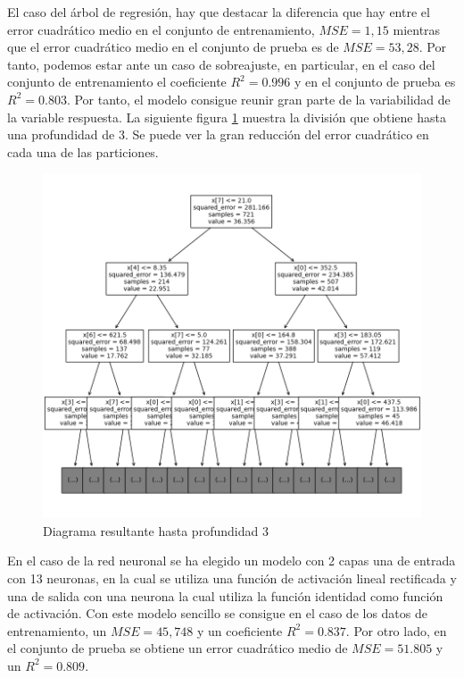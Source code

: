 \noindent El caso del árbol de regresión, hay que destacar la diferencia que hay entre el error cuadrático medio en el conjunto de entrenamiento, $MSE=1,15$ mientras que el error cuadrático medio en el conjunto de prueba es de $MSE=53,28$. Por tanto, podemos estar ante un caso de sobreajuste, en particular, en el caso del conjunto de entrenamiento el coeficiente $R^2=0.996$ y en el conjunto de prueba es $R^2=0.803$.  Por tanto, el modelo consigue reunir gran parte de la variabilidad de la variable respuesta. La siguiente figura \ref{fig:diagrama arbol} muestra la división que obtiene hasta una profundidad de 3. Se puede ver la gran reducción del error cuadrático en cada una de las particiones.

\begin{figure}[h]
  \centering
  \includegraphics[scale=0.30]{Documentos Extra/Imagenes/Arbol.png}
  \caption{Diagrama resultante hasta profundidad 3}
  \label{fig:diagrama arbol}
\end{figure}
  

\noindent En el caso de la red neuronal se ha elegido un modelo con 2 capas una de entrada con 13 neuronas, en la cual se utiliza una función de activación lineal rectificada y una de salida con una neurona la cual utiliza la función identidad como función de activación. Con este modelo sencillo se consigue en el caso de los datos de entrenamiento, un $MSE=45,748$ y un coeficiente $R^2=0.837$. Por otro lado, en el conjunto de prueba se obtiene un error cuadrático medio de $MSE=51.805$ y un $R^2=0.809$.

